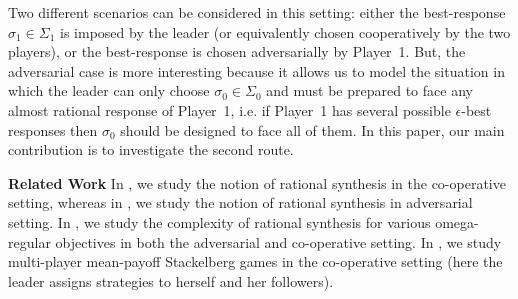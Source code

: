 Two different scenarios can be considered in this setting: either the best-response $\sigma_1 \in \Sigma_1$ is imposed by the leader (or equivalently chosen cooperatively by the two players), or the best-response is chosen adversarially by Player~1. But, the adversarial case is more interesting because it allows us to model the situation in which the leader can only choose $\sigma_0 \in \Sigma_0$ and must be prepared to face any almost rational response of Player~1, i.e. if Player~1 has several possible $\epsilon$-best responses then $\sigma_0$ should be designed to face all of them. In this paper, our main contribution is to investigate the second route.

\textbf{Related Work} In \cite{FKL10}, we study the notion of rational synthesis in the co-operative setting, whereas in \cite{KPV16}, we study the notion of rational synthesis in adversarial setting. In \cite{CFGR16}, we study the complexity of rational synthesis for various omega-regular objectives in both the adversarial and co-operative setting. In \cite{GS14}, we study multi-player mean-payoff Stackelberg games in the co-operative setting (here the leader assigns strategies to herself and her followers). 



